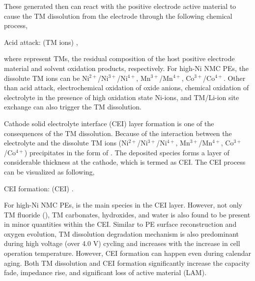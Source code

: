 \documentclass[aps,prb,twocolumn,superscriptaddress,reprint]{revtex4-1}
\begin{document}
These generated  then can react with the positive electrode active material to cause the TM dissolution from the electrode through the following chemical process, \cite{li2018temperature}

\begin{center}
    Acid attack:  (TM ions) ,
\end{center}

where  represent TMs, the residual composition of the host positive electrode material and solvent oxidation products, respectively. For high-Ni NMC PEs, the dissolute TM ions can be Ni$^{2+}$/Ni$^{3+}$/Ni$^{4+}$, Mn$^{3+}$/Mn$^{4+}$, Co$^{3+}$/Co$^{4+}$. Other than acid attack, electrochemical oxidation of oxide anions, \cite{billy2018dissolution} chemical oxidation of electrolyte in the presence of high oxidation state Ni-ions, \cite{jung2017oxygen,li2018temperature} and TM/Li-ion site exchange\cite{zhao2017new} can also trigger the TM dissolution.

Cathode solid electrolyte interface (CEI) layer formation is one of the consequences of the TM dissolution. Because of the interaction between the electrolyte and the dissolute TM ions (Ni$^{2+}$/Ni$^{3+}$/Ni$^{4+}$, Mn$^{3+}$/Mn$^{4+}$, Co$^{3+}$/Co$^{4+}$) precipitates in the form of . The deposited  species forms a layer of considerable thickness at the cathode, which is termed as CEI. The CEI process can be visualized as following, \cite{li2018temperature,jung2018effect}

\begin{center}
    CEI formation:  (CEI) .
\end{center}

For high-Ni NMC PEs,  is the main species in the CEI layer. \cite{li2018temperature} However, not only TM fluoride (), TM carbonates, hydroxides, and water is also found to be present in minor quantities within the CEI. \cite{li2018temperature, jung2018effect,erickson2017recent} Similar to PE surface reconstruction and oxygen evolution, TM dissolution degradation mechanism is also predominant during high voltage (over 4.0 V) cycling and increases with the increase in cell operation temperature. \cite{li2018temperature} However, CEI formation can happen even during calendar aging. \cite{jung2018effect} Both TM dissolution and CEI formation significantly increase the capacity fade, impedance rise, and significant loss of active material (LAM). \cite{erickson2017recent,erickson2017recent}
\end{document}
